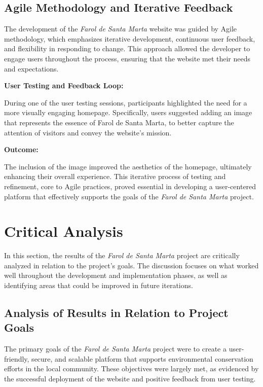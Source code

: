 \subsection{Agile Methodology and Iterative Feedback}

The development of the \textit{Farol de Santa Marta} website was guided by Agile methodology, which emphasizes iterative development, continuous user feedback, and flexibility in responding to change. This approach allowed the developer to engage users throughout the process, ensuring that the website met their needs and expectations.

\textbf{User Testing and Feedback Loop:}

During one of the user testing sessions, participants highlighted the need for a more visually engaging homepage. Specifically, users suggested adding an image that represents the essence of Farol de Santa Marta, to better capture the attention of visitors and convey the website's mission.

\textbf{Outcome:}

The inclusion of the image improved the aesthetics of the homepage, ultimately enhancing their overall experience. This iterative process of testing and refinement, core to Agile practices, proved essential in developing a user-centered platform that effectively supports the goals of the \textit{Farol de Santa Marta} project.

\section{Critical Analysis}

In this section, the results of the \textit{Farol de Santa Marta} project are critically analyzed in relation to the project's goals. The discussion focuses on what worked well throughout the development and implementation phases, as well as identifying areas that could be improved in future iterations.

\subsection{Analysis of Results in Relation to Project Goals}

The primary goals of the \textit{Farol de Santa Marta} project were to create a user-friendly, secure, and scalable platform that supports environmental conservation efforts in the local community. These objectives were largely met, as evidenced by the successful deployment of the website and positive feedback from user testing.

